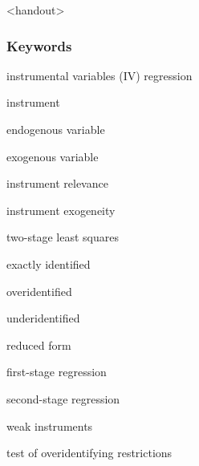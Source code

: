 

\begin{frame}<handout>
\frametitle{Keywords}
\begin{iteminline}
\item instrumental variables (IV) regression
\item instrument
\item endogenous variable
\item exogenous variable
\item instrument relevance
\item instrument exogeneity
\item two-stage least squares
\item exactly identified
\item overidentified
\item underidentified
\item reduced form
\item first-stage regression
\item second-stage regression
\item weak instruments
\item test of overidentifying restrictions
\end{iteminline}
\end{frame}


